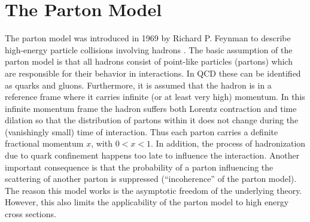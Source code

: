 \section{The Parton Model}
The parton model was introduced in 1969 by Richard P. Feynman to describe high-energy particle collisions involving hadrons \cite{feynman1969}.
The basic assumption of the parton model is that all hadrons consist of point-like particles (partons) which are responsible for their behavior in interactions.
In QCD these can be identified as quarks and gluons.
Furthermore, it is assumed that the hadron is in a reference frame where it carries infinite (or at least very high) momentum.
In this infinite momentum frame the hadron suffers both Lorentz contraction and time dilation so that the distribution of partons within it does not change during the (vanishingly small) time of interaction.
Thus each parton carries a definite fractional momentum $x$, with $0<x<1$.
In addition, the process of hadronization due to quark confinement happens too late to influence the interaction.
Another important consequence is that the probability of a parton influencing the scattering of another parton is suppressed (\enquote{incoherence} of the parton model).
The reason this model works is the asymptotic freedom of the underlying theory.
However, this also limits the applicability of the parton model to high energy cross sections.


